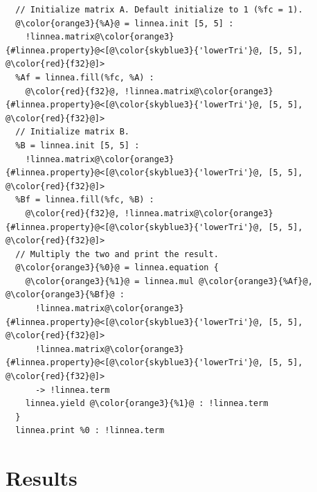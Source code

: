 \documentclass[conference]{IEEEtran}
\begin{document}
\begin{listing}[]
\begin{center}
\begin{minipage}[]{0.5\textwidth}
\begin{verbatim}
  // Initialize matrix A. Default initialize to 1 (%fc = 1).
  @\color{orange3}{%A}@ = linnea.init [5, 5] : 
    !linnea.matrix@\color{orange3}{#linnea.property}@<[@\color{skyblue3}{'lowerTri'}@, [5, 5], @\color{red}{f32}@]>
  %Af = linnea.fill(%fc, %A) : 
    @\color{red}{f32}@, !linnea.matrix@\color{orange3}{#linnea.property}@<[@\color{skyblue3}{'lowerTri'}@, [5, 5], @\color{red}{f32}@]>
  // Initialize matrix B.
  %B = linnea.init [5, 5] : 
    !linnea.matrix@\color{orange3}{#linnea.property}@<[@\color{skyblue3}{'lowerTri'}@, [5, 5], @\color{red}{f32}@]>
  %Bf = linnea.fill(%fc, %B) : 
    @\color{red}{f32}@, !linnea.matrix@\color{orange3}{#linnea.property}@<[@\color{skyblue3}{'lowerTri'}@, [5, 5], @\color{red}{f32}@]>
  // Multiply the two and print the result.
  @\color{orange3}{%0}@ = linnea.equation {
    @\color{orange3}{%1}@ = linnea.mul @\color{orange3}{%Af}@, @\color{orange3}{%Bf}@ :
      !linnea.matrix@\color{orange3}{#linnea.property}@<[@\color{skyblue3}{'lowerTri'}@, [5, 5], @\color{red}{f32}@]>
      !linnea.matrix@\color{orange3}{#linnea.property}@<[@\color{skyblue3}{'lowerTri'}@, [5, 5], @\color{red}{f32}@]> 
      -> !linnea.term
    linnea.yield @\color{orange3}{%1}@ : !linnea.term
  }
  linnea.print %0 : !linnea.term
\end{verbatim}
\end{minipage}
\vspace{-0.7em}
\caption{A Linnea IR representation for a multiplication between two lower triangular matrices.}
\label{lst:endtoend}
\end{center}
\end{listing}

\section{Results}
\end{document}
